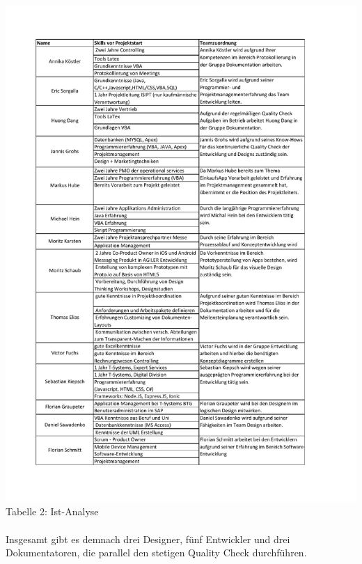 \documentclass[12pt,a4paper]{article}
\begin{document}
\hspace*{-10mm} \includegraphics[trim = 15mm 0mm 0mm 20mm,clip,scale=0.8]{Skillliste.pdf}
\linebreak
\footnotesize Tabelle 2: Ist-Analyse
\\
\normalsize
\linebreak
\\
\newline
\newline
Insgesamt gibt es demnach drei Designer, fünf Entwickler und drei Dokumentatoren, die parallel den stetigen Quality Check durchführen.
\\
\end{document}
